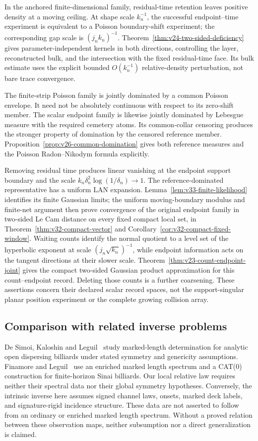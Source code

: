 In the anchored finite-dimensional family, residual-time retention leaves
positive density at a moving ceiling.  At shape scale \(k_n^{-1}\), the
successful endpoint--time experiment is equivalent to a Poisson boundary-shift
experiment; the corresponding gap scale is \((j_nk_n)^{-1}\).
Theorem~\ref{thm:v24-two-sided-deficiency} gives parameter-independent kernels
in both directions, controlling the layer, reconstructed bulk, and the
intersection with the fixed residual-time face.  Its bulk estimate uses the
explicit bounded \(O(k_n^{-1})\) relative-density perturbation, not bare
trace convergence.

The finite-strip Poisson family is jointly dominated by a common Poisson
envelope.  It need not be absolutely continuous with respect to its
zero-shift member.  The scalar endpoint family is likewise jointly dominated
by Lebesgue measure with the required cemetery atoms.  Its common-collar
censoring produces the stronger property of domination by the censored
reference member.  Proposition~\ref{prop:v26-common-domination} gives both
reference measures and the Poisson Radon--Nikodym formula explicitly.

Removing residual time produces linear vanishing at the endpoint support
boundary and the scale \(k_n\delta_n^2\log(1/\delta_n)\to1\).
The reference-dominated representative has a uniform LAN expansion.
Lemma~\ref{lem:v33-finite-likelihood} identifies its finite Gaussian limits;
the uniform moving-boundary modulus and finite-net argument then prove
convergence of the original endpoint family in two-sided Le Cam distance
on every fixed compact local set, in Theorem~\ref{thm:v32-compact-vector}
and Corollary~\ref{cor:v32-compact-fixed-window}.
Waiting counts identify the normal quotient to a level set of the
hyperbolic exponent at scale \((j_n\sqrt{k_n})^{-1}\), while endpoint
information acts on the tangent directions at their slower scale.
Theorem~\ref{thm:v23-count-endpoint-joint} gives the compact two-sided
Gaussian product approximation for this count--endpoint record.
Deleting those counts is a further coarsening.  These assertions concern
their declared scalar record spaces, not the support-singular planar
position experiment or the complete growing collision array.

\subsection{Comparison with related inverse problems}

De Simoi, Kaloshin and Leguil~\cite{DSKL} study marked-length determination
for analytic open dispersing billiards under stated symmetry and genericity
assumptions.  Finamore and Leguil~\cite{FinamoreLeguil} use an enriched
marked length spectrum and a CAT(0) construction for finite-horizon Sinai
billiards.  Our local relative law requires neither their spectral data nor
their global symmetry hypotheses.  Conversely, the intrinsic inverse here
assumes signed channel laws, onsets, marked deck labels, and signature-rigid
incidence structure.  These data are not asserted to follow from an ordinary
or enriched marked length spectrum.  Without a proved relation between
these observation maps, neither subsumption nor a direct generalization
is claimed.

